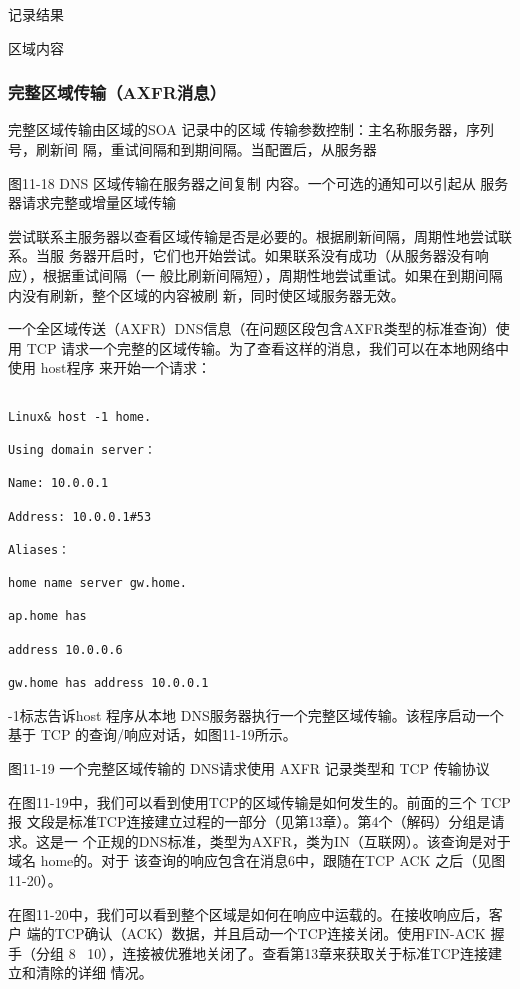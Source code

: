 记录结果

区域内容

\subsubsection{完整区域传输（AXFR消息）}

完整区域传输由区域的SOA 记录中的区域
传输参数控制：主名称服务器，序列号，刷新间
隔，重试间隔和到期间隔。当配置后，从服务器

图11-18
DNS 区域传输在服务器之间复制
内容。一个可选的通知可以引起从
服务器请求完整或增量区域传输

尝试联系主服务器以查看区域传输是否是必要的。根据刷新间隔，周期性地尝试联系。当服
务器开启时，它们也开始尝试。如果联系没有成功（从服务器没有响应），根据重试间隔（一
般比刷新间隔短），周期性地尝试重试。如果在到期间隔内没有刷新，整个区域的内容被刷
新，同时使区域服务器无效。

一个全区域传送（AXFR）DNS信息（在问题区段包含AXFR类型的标准查询）使用
TCP 请求一个完整的区域传输。为了查看这样的消息，我们可以在本地网络中使用 host程序
来开始一个请求：

\begin{verbatim}
    
Linux& host -1 home.

Using domain server：

Name: 10.0.0.1

Address: 10.0.0.1#53

Aliases：

home name server gw.home.

ap.home has

address 10.0.0.6

gw.home has address 10.0.0.1
\end{verbatim}

-1标志告诉host 程序从本地 DNS服务器执行一个完整区域传输。该程序启动一个基于 TCP
的查询/响应对话，如图11-19所示。

图11-19 一个完整区域传输的 DNS请求使用 AXFR 记录类型和 TCP 传输协议

在图11-19中，我们可以看到使用TCP的区域传输是如何发生的。前面的三个 TCP报
文段是标准TCP连接建立过程的一部分（见第13章）。第4个（解码）分组是请求。这是一
个正规的DNS标准，类型为AXFR，类为IN（互联网）。该查询是对于域名 home的。对于
该查询的响应包含在消息6中，跟随在TCP ACK 之后（见图11-20）。

在图11-20中，我们可以看到整个区域是如何在响应中运载的。在接收响应后，客户
端的TCP确认（ACK）数据，并且启动一个TCP连接关闭。使用FIN-ACK 握手（分组
8 ~10），连接被优雅地关闭了。查看第13章来获取关于标准TCP连接建立和清除的详细
情况。

